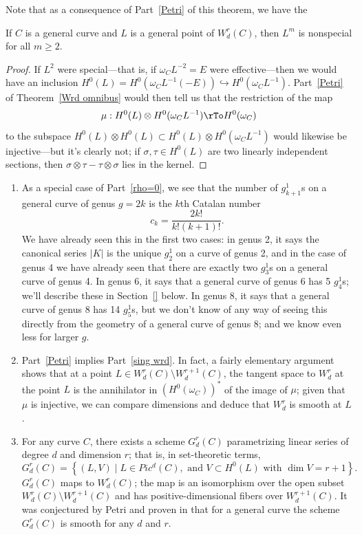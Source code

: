 Note that as a consequence of Part~\ref{Petri} of this theorem, we have the

\begin{corollary}\label{2L nonspecial}
If $C$ is a general curve and $L$ is a general point of $W^r_d(C)$, then $L^m$ is nonspecial for all $m \geq 2$.
\end{corollary}

\begin{proof}
 If $L^2$ were special---that is, if $\omega_CL^{-2} = E$ were effective---then we would have an inclusion $H^0(L) = H^0(\omega_CL^{-1}(-E)) \hookrightarrow H^0(\omega_CL^{-1})$. Part~\ref{Petri} of Theorem~\ref{Wrd omnibus} would then tell us that the restriction of the map 
 $$
\mu : H^0(L) \otimes H^0(\omega_CL^{-1}) \rTo H^0(\omega_C)
$$
to the subspace $H^0(L) \otimes H^0(L) \subset H^0(L) \otimes H^0(\omega_CL^{-1})$ would likewise be injective---but it's clearly not; if $\sigma, \tau \in H^0(L)$ are two linearly independent sections, then $\sigma \otimes \tau - \tau \otimes \sigma$ lies in the kernel.
\end{proof}

\begin{remark}
\begin{enumerate}
\item As a special case of Part~\ref{rho=0}, we see that the number of $g^1_{k+1}$s on a general curve of genus $g = 2k$ is the $k$th Catalan number 
$$
c_k = \frac{2k!}{k!(k+1)!}.
$$
We have already seen this in the first two cases: in genus 2, it says the canonical series $|K|$ is the unique $g^1_2$ on a curve of genus 2, and in the case of genus 4 we have already seen  that there are exactly two $g^1_3$s on a general curve of genus 4. In genus 6, it says that a general curve of genus 6 has 5 $g^1_4$s; we'll describe these in Section~\ref{} below.  In genus 8, it says that a general curve of genus 8 has 14 $g^1_5$s, but we don't know of any way of seeing this directly from the geometry of a general curve of genus 8; and we know even less for larger $g$.

\item Part~\ref{Petri} implies Part~\ref{sing wrd}. In fact, a fairly elementary argument shows that at a point $L \in W^r_d(C) \setminus W^{r+1}_d(C)$, the tangent space to $W^r_d$ at the point $L$ is the annihilator
in $(H^0(\omega_C))^*$ of the image of $\mu$; given that $\mu$ is injective, we can compare dimensions and deduce that $W^r_d$ is smooth at $L$.

\item For any curve $C$, there exists a scheme $G^r_d(C)$ parametrizing linear series of degree $d$ and dimension $r$; that is, in set-theoretic terms,
$$
G^r_d(C) = \left\{ (L, V) \mid L \in Pic^d(C), \text{ and } V \subset H^0(L) \text{ with } \dim V = r+1 \right\}.
$$
$G^r_d(C)$ maps to $W^r_d(C)$; the map is an isomorphism over the open subset $W^r_d(C) \setminus W^{r+1}_d(C)$ and has positive-dimensional fibers over $W^{r+1}_d(C)$. It was conjectured
by Petri and proven in \cite{Gieseker-Petri} that for a general curve the scheme $G^r_d(C)$ is smooth for any $d$ and $r$.
\end{enumerate}
\end{remark}


